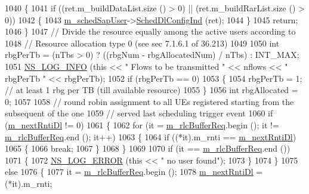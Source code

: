 \begin{DoxyCode}
1040     \{
1041       \textcolor{keywordflow}{if} ((ret.m\_buildDataList.size () > 0) || (ret.m\_buildRarList.size () > 0))
1042         \{
1043           \hyperlink{classns3_1_1RrFfMacScheduler_a1d834e008836f5b748b81d8d3dc5f926}{m\_schedSapUser}->\hyperlink{classns3_1_1FfMacSchedSapUser_a28f8484af5a32a45ee6c0e51770d83f7}{SchedDlConfigInd} (ret);
1044         \}
1045       \textcolor{keywordflow}{return};
1046     \}
1047   \textcolor{comment}{// Divide the resource equally among the active users according to}
1048   \textcolor{comment}{// Resource allocation type 0 (see sec 7.1.6.1 of 36.213)}
1049 
1050   \textcolor{keywordtype}{int} rbgPerTb = (nTbs > 0) ? ((rbgNum - rbgAllocatedNum) / nTbs) : INT\_MAX;
1051   \hyperlink{group__logging_gafbd73ee2cf9f26b319f49086d8e860fb}{NS\_LOG\_INFO} (\textcolor{keyword}{this} << \textcolor{stringliteral}{" Flows to be transmitted "} << nflows << \textcolor{stringliteral}{" rbgPerTb "} << rbgPerTb);
1052   \textcolor{keywordflow}{if} (rbgPerTb == 0)
1053     \{
1054       rbgPerTb = 1;                \textcolor{comment}{// at least 1 rbg per TB (till available resource)}
1055     \}
1056   \textcolor{keywordtype}{int} rbgAllocated = 0;
1057 
1058   \textcolor{comment}{// round robin assignment to all UEs registered starting from the subsequent of the one}
1059   \textcolor{comment}{// served last scheduling trigger event}
1060   \textcolor{keywordflow}{if} (\hyperlink{classns3_1_1RrFfMacScheduler_a7c5404bfe1ef2446a6e920a9d80a8f51}{m\_nextRntiDl} != 0)
1061     \{
1062       \textcolor{keywordflow}{for} (it = \hyperlink{classns3_1_1RrFfMacScheduler_a25a4bfbb928e22dc026209de004b90fd}{m\_rlcBufferReq}.begin (); it != \hyperlink{classns3_1_1RrFfMacScheduler_a25a4bfbb928e22dc026209de004b90fd}{m\_rlcBufferReq}.end (); it++)
1063         \{
1064           \textcolor{keywordflow}{if} ((*it).m\_rnti == \hyperlink{classns3_1_1RrFfMacScheduler_a7c5404bfe1ef2446a6e920a9d80a8f51}{m\_nextRntiDl})
1065             \{
1066               \textcolor{keywordflow}{break};
1067             \}
1068         \}
1069 
1070       \textcolor{keywordflow}{if} (it == \hyperlink{classns3_1_1RrFfMacScheduler_a25a4bfbb928e22dc026209de004b90fd}{m\_rlcBufferReq}.end ())
1071         \{
1072           \hyperlink{group__logging_ga0261a8db1d4ac5f79417d117634fd455}{NS\_LOG\_ERROR} (\textcolor{keyword}{this} << \textcolor{stringliteral}{" no user found"});
1073         \}
1074     \}
1075   \textcolor{keywordflow}{else}
1076     \{
1077       it = \hyperlink{classns3_1_1RrFfMacScheduler_a25a4bfbb928e22dc026209de004b90fd}{m\_rlcBufferReq}.begin ();
1078       \hyperlink{classns3_1_1RrFfMacScheduler_a7c5404bfe1ef2446a6e920a9d80a8f51}{m\_nextRntiDl} = (*it).m\_rnti;

\end{DoxyCode}
